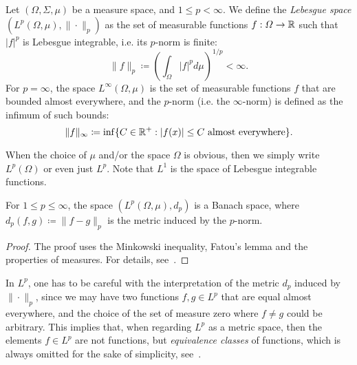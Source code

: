 \begin{definition}
    Let $(\Omega, \Sigma, \mu)$ be a measure space, and $1\leq p<\infty$. We define the \emph{Lebesgue space} $(L^p(\Omega,\mu), \|\cdot\|_p)$ as the set of measurable functions $f:\Omega\to \mathbb{R}$ such that $|f|^p$ is Lebesgue integrable, i.e. its $p$-norm is finite:
    \begin{equation*}
        \|f\|_p \coloneqq \left(\int_\Omega |f|^p d\mu\right)^{1/p} < \infty.
    \end{equation*}
    For $p=\infty$, the space $L^\infty(\Omega,\mu)$ is the set of measurable functions $f$ that are bounded almost everywhere, and the $p$-norm (i.e. the $\infty$-norm) is defined as the infimum of such bounds: 
    \begin{equation*}
        \|f\|_\infty \coloneqq \inf\{C\in\mathbb{R}^+: |f(x)|\leq C \text{ almost everywhere}\}.
    \end{equation*}

    When the choice of $\mu$ and/or the space $\Omega$ is obvious, then we simply write $L^p(\Omega)$ or even just $L^p$. Note that $L^1$ is the space of Lebesgue integrable functions.
\end{definition}
\begin{theorem}
    For $1\leq p\leq\infty$, the space $(L^p(\Omega, \mu), d_p)$ is a Banach space, where $d_p(f,g) \coloneqq \|f-g\|_p$ is the metric induced by the $p$-norm.
    \begin{proof}
        The proof uses the Minkowski inequality, Fatou's lemma and the properties of measures. For details, see~\cite[Theorem 3.11]{Rudin_2013}.
    \end{proof}
\end{theorem}
In $L^p$, one has to be careful with the interpretation of the metric $d_p$ induced by $\|\cdot\|_p$, since we may have two functions $f,g\in L^p$ that are equal almost everywhere, and the choice of the set of measure zero where $f\neq g$ could be arbitrary. This implies that, when regarding $L^p$ as a metric space, then the elements $f\in L^p$ are not functions, but \emph{equivalence classes} of functions, which is always omitted for the sake of simplicity, see~\cite[Remark 3.10]{Rudin_2013}.


